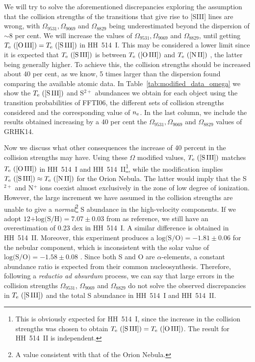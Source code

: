 \documentclass[fleqn,usenatbib]{mnras}
\begin{document}
We will try to solve the aforementioned discrepancies exploring the assumption that the collision strengths of the transitions that give rise to [S\thinspace III] lines are wrong, with $\Omega_{9531}, \Omega_{9069}$ and $\Omega_{8829}$ being underestimated beyond the dispersion of $\sim8$ per cent. We will increase the values of $\Omega_{9531}, \Omega_{9069}$ and $\Omega_{8829}$, until getting $T_{\rm e} \text{ ([O\thinspace III])}=T_{\rm e} \text{ ([S\thinspace III])} $ in HH~514~I. This may be considered a lower limit since it is expected that $T_{\rm e} \text{ ([S\thinspace III])} $ is between $T_{\rm e} \text{ ([O\thinspace III])} $ and $T_{\rm e} \text{ ([N\thinspace II])} $ \citep[][]{Berg20}, the latter being generally higher. To achieve this, the collision strengths should be increased about 40 per cent, as we know, 5 times larger than the dispersion found comparing the available atomic data. In Table~\ref{tab:modified_data_omega} we show the $T_{\rm e} \text{ ([S\thinspace III])} $ and  S$^{2+}$ abundances we obtain for each object using the transition probabilities of FFTI06, the different sets of collision strengths considered and the corresponding value of $n_{\rm e}$. In the last column, we include the results obtained increasing by a 40 per cent the $\Omega_{9531}, \Omega_{9069}$ and $\Omega_{8829}$ values of GRHK14. 

Now we discuss what other consequences the increase of 40 percent in the collision strengths may have. Using these $\Omega$ modified values, $T_{\rm e} \text{ ([S\thinspace III])}$ matches $T_{\rm e} \text{ ([O\thinspace III])}$ in HH~514~I and HH~514~II\footnote{This is obviously expected for HH~514~I, since the increase in the collision strengths was chosen to obtain $T_{\rm e} \text{ ([S\thinspace III])}= T_{\rm e} \text{ ([O\thinspace III])}$. The result for HH~514~II is independent.}, while the modification implies $T_{\rm e} \text{ ([S\thinspace III])}\approx T_{\rm e} \text{ ([N\thinspace II])}$ for the Orion Nebula. The latter would imply that the S$^{2+}$ and N$^{+}$ ions coexist almost exclusively in the zone of low degree of ionization. However, the large increment we have assumed in the collision strengths are unable to give a \textit{normal}\footnote{A value consistent with that of the Orion Nebula.} S abundance in the high-velocity components. If we adopt $\text{12+log(S/H)}=7.07 \pm 0.03$ from \citet{mendez2021-2} as reference, we still have an overestimation of 0.23 dex in HH~514~I. A similar difference is obtained in HH~514~II. Moreover, this experiment produces a $\text{log(S/O)} = -1.81 \pm 0.06$ for the nebular component, which is inconsistent with the solar value of $\text{log(S/O)}=-1.58 \pm 0.08$ \citep{lodders19}. Since both S and O are $\alpha$-elements, a constant abundance ratio is expected from their common nucleosynthesis. Therefore, following a \textit{reductio ad absurdum} process, we can say that large errors in the collision strengths $\Omega_{9531}$, $\Omega_{9069}$ and $\Omega_{8829}$ do not solve the observed discrepancies in  $T_{\rm e} \text{ ([S\thinspace III])}$ and the total S abundance in HH~514~I and HH~514~II.
\end{document}
